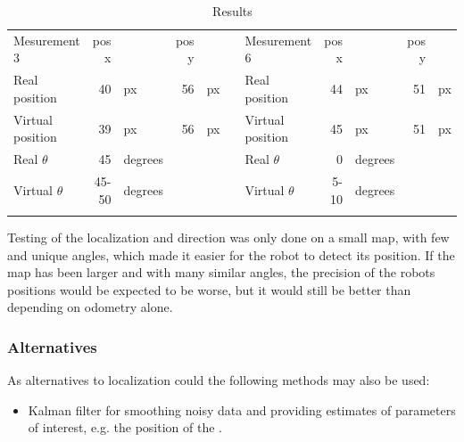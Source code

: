 \begin{table}[H]
\begin{tabular}{|lrlrll|lrlrl|}
\rowcolor[HTML]{9B9B9B} 
Mesurement 3            & pos x &         & pos y &    &  & Mesurement 6            & pos x   &         & pos y &    \\
Real position           & 40    & px      & 56    & px &  & Real position           & 44      & px      & 51    & px \\
Virtual position        & 39    & px      & 56    & px &  & Virtual position        & 45      & px      & 51    & px \\
Real $\theta$    & 45    & degrees &       &    &  & Real $\theta$    & 0       & degrees &       &    \\
Virtual $\theta$ & 45-50 & degrees &       &    &  & Virtual $\theta$ & 5-10    & degrees &       &   \\ 
 &  &  &       &    &  &  &    &  &       &   \\ \hline
\end{tabular}
\caption{Results}
\label{tab::results}
\end{table}

Testing of the localization and direction was only done on a small map, with few and unique angles, which made it easier for the robot to detect its position. If the map has been larger and with many similar angles, the precision of the robots positions would be expected to be worse, but it would still be better than depending on odometry alone.

\subsubsection{Alternatives}
As alternatives to localization could the following methods may also be used:
\begin{itemize}\itemsep-2pt
\item Kalman filter for smoothing noisy data and providing estimates of parameters of interest, e.g. the position of the .

\end{itemize}


